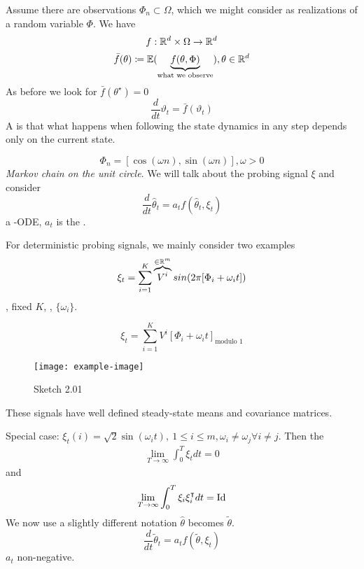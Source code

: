 Assume there are observations \(\Phi_n\subset \Omega\), which 
we might consider as realizations of a random variable \(\Phi\).
We have \[f:\mathbb{R}^d\times \Omega\to\mathbb{R}^d\]
\[\bar{f}(\theta)\coloneqq \mathbb{E}(\underbrace{f(\theta,\Phi)}_{\text{what we observe}}), \theta\in\mathbb{R}^d\]
As before we look for \(\bar{f}(\theta^\star)=0\)
\[\frac{d}{dt}\vartheta_t=\bar{f}(\vartheta_t)\]
A  is that what happens when following the state 
dynamics in any step depends only on the current state.

\[\Phi_n=[\cos(\omega n),\sin(\omega n)],\omega>0\]
\textit{Markov chain on the unit circle}. We will talk about the probing signal \(\xi\)
and consider 
\begin{equation}\label{eq:qsa-ode}
    \frac{d}{dt}\hat{\theta}_t=a_t  f(\hat{\theta}_t,\xi_t)
\end{equation}
a -ODE, \(a_t\) is the . 

For deterministic probing signals, we mainly consider two examples 
\[\xi_t=\sum_{i=1}^K \overbrace{V^i}^{\in \mathbb{R}^m}sin(2\pi[\Phi_i+\omega_i t])\]
, fixed \(K\), ,  \(\{\omega_i\}\).

\[\xi_t=\sum_{i=1}^K V^i[\Phi_i+\omega_it]_{\text{modulo 1}}\]

\begin{figure}[H]\label{fig:2.01}
    \centering
    \texttt{[image: example-image]}
    \caption{Sketch 2.01}
\end{figure}

These signals have well defined steady-state means and covariance matrices.

Special case: \(\xi_t(i)=\sqrt{2}\sin(\omega_it),\ 1\leq i\leq m,\omega_i\neq \omega_j\forall i\neq j\). Then the 
\begin{align*}
    \lim_{T\to\infty}\int_{0}^{T}\xi_t dt =0 
\end{align*}
and 
\begin{align*}
    \lim_{T\to\infty}\int_0^T\xi_i\xi_i^\intercal dt=\text{Id}
\end{align*}
We now use a slightly different notation \(\hat{\theta}\) becomes \(\tilde{\theta}\).
\begin{equation}\label{eq:QSA-ODE}
    \frac{d}{dt}\tilde{\theta}_t=a_t f(\tilde{\theta},\xi_t)
\end{equation}
\(a_t\) non-negative.

